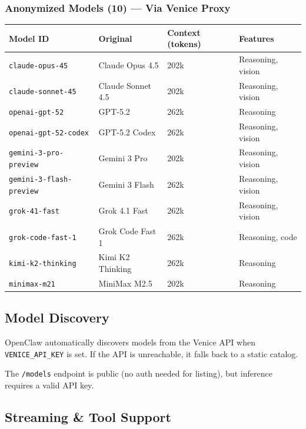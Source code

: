 \subsubsection{Anonymized Models (10) — Via Venice Proxy}



\begin{table}[h]
\centering
\small
\begin{tabular}{|l|l|l|l|}
\hline
Model ID & Original & Context (tokens) & Features \\
\hline
\texttt{claude-opus-45} & Claude Opus 4.5 & 202k & Reasoning, vision \\
\hline
\texttt{claude-sonnet-45} & Claude Sonnet 4.5 & 202k & Reasoning, vision \\
\hline
\texttt{openai-gpt-52} & GPT-5.2 & 262k & Reasoning \\
\hline
\texttt{openai-gpt-52-codex} & GPT-5.2 Codex & 262k & Reasoning, vision \\
\hline
\texttt{gemini-3-pro-preview} & Gemini 3 Pro & 202k & Reasoning, vision \\
\hline
\texttt{gemini-3-flash-preview} & Gemini 3 Flash & 262k & Reasoning, vision \\
\hline
\texttt{grok-41-fast} & Grok 4.1 Fast & 262k & Reasoning, vision \\
\hline
\texttt{grok-code-fast-1} & Grok Code Fast 1 & 262k & Reasoning, code \\
\hline
\texttt{kimi-k2-thinking} & Kimi K2 Thinking & 262k & Reasoning \\
\hline
\texttt{minimax-m21} & MiniMax M2.5 & 202k & Reasoning \\
\hline
\end{tabular}
\end{table}



\subsection{Model Discovery}


OpenClaw automatically discovers models from the Venice API when \texttt{VENICE\_API\_KEY} is set. If the API is unreachable, it falls back to a static catalog.

The \texttt{/models} endpoint is public (no auth needed for listing), but inference requires a valid API key.

\subsection{Streaming \& Tool Support}



